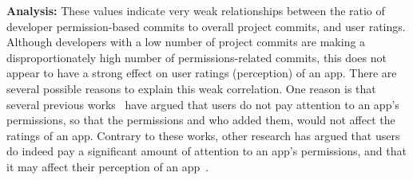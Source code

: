 \documentclass{sig-alternate-05-2015}
\newcommand{\todo}[1]{\textcolor{cyan}{\textbf{[#1]}}}
\newcommand{\dan}[1]{\textcolor{blue}{{\it [Dan says: #1]}}}
\begin{document}
\vspace{4 mm}
\noindent
\textbf{Analysis: }These values indicate very weak relationships between the ratio of developer permission-based commits to overall project commits, and user ratings. Although developers with a low number of project commits are making a disproportionately high number of permissions-related commits, this does not appear to have a strong effect on user ratings (perception) of an app. There are several possible reasons to explain this weak correlation. One reason is that several previous works~\cite{Kelley:2012:CPI:2426020.2426027, Felt:2012:APU:2335356.2335360} have argued that users do not pay attention to an app's permissions, so that the permissions and who added them, would not affect the ratings of an app. Contrary to these works, other research has argued that users do indeed pay a significant amount of attention to an app's permissions, and that it may affect their perception of an app~\cite{Egelman12choicearchitecture, Lin:2012:EPU:2370216.2370290}.










%	
\end{document}
